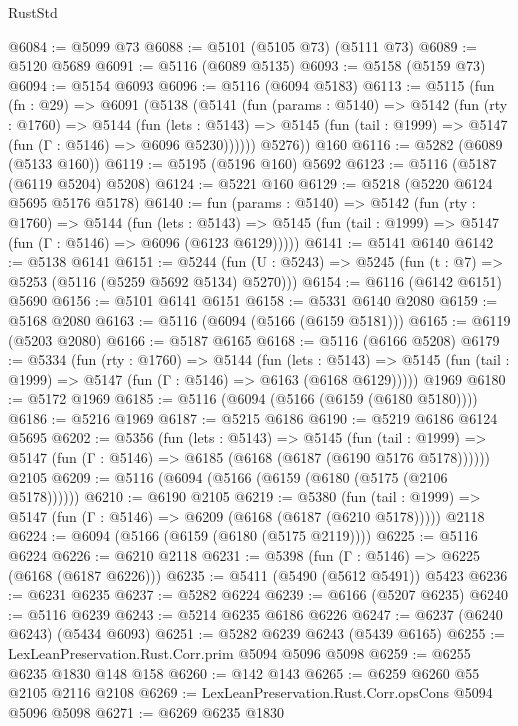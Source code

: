 \begin{lexlean}{RustStd}
\begin{coremodule}
{\begin{coremodule}
{{{{{{{{{{{{{{{{{{{{{{{{{{{{{{{@6084 := @5099 @73
@6088 := @5101 (@5105 @73) (@5111 @73)
@6089 := @5120 @5689
@6091 := @5116 (@6089 @5135)
@6093 := @5158 (@5159 @73)
@6094 := @5154 @6093
@6096 := @5116 (@6094 @5183)
@6113 := @5115
    (fun (fn : @29) =>
    @6091
      (@5138
        (@5141
          (fun (params : @5140) =>
          @5142
            (fun (rty : @1760) =>
            @5144
              (fun (lets : @5143) =>
              @5145 (fun (tail : @1999) => @5147 (fun (Γ : @5146) => @6096 @5230))))))
        @5276))
    @160
@6116 := @5282 (@6089 (@5133 @160))
@6119 := @5195 (@5196 @160) @5692
@6123 := @5116 (@5187 (@6119 @5204) @5208)
@6124 := @5221 @160
@6129 := @5218 (@5220 @6124 @5695 @5176 @5178)
@6140 := fun (params : @5140) =>
  @5142
    (fun (rty : @1760) =>
    @5144
      (fun (lets : @5143) =>
      @5145 (fun (tail : @1999) => @5147 (fun (Γ : @5146) => @6096 (@6123 @6129)))))
@6141 := @5141 @6140
@6142 := @5138 @6141
@6151 := @5244 (fun (U : @5243) => @5245 (fun (t : @7) => @5253 (@5116 (@5259 @5692 @5134) @5270)))
@6154 := @6116 (@6142 @6151) @5690
@6156 := @5101 @6141 @6151
@6158 := @5331 @6140 @2080
@6159 := @5168 @2080
@6163 := @5116 (@6094 (@5166 (@6159 @5181)))
@6165 := @6119 (@5203 @2080)
@6166 := @5187 @6165
@6168 := @5116 (@6166 @5208)
@6179 := @5334
    (fun (rty : @1760) =>
    @5144
      (fun (lets : @5143) =>
      @5145 (fun (tail : @1999) => @5147 (fun (Γ : @5146) => @6163 (@6168 @6129)))))
    @1969
@6180 := @5172 @1969
@6185 := @5116 (@6094 (@5166 (@6159 (@6180 @5180))))
@6186 := @5216 @1969
@6187 := @5215 @6186
@6190 := @5219 @6186 @6124 @5695
@6202 := @5356
    (fun (lets : @5143) =>
    @5145
      (fun (tail : @1999) => @5147 (fun (Γ : @5146) => @6185 (@6168 (@6187 (@6190 @5176 @5178))))))
    @2105
@6209 := @5116 (@6094 (@5166 (@6159 (@6180 (@5175 (@2106 @5178))))))
@6210 := @6190 @2105
@6219 := @5380
    (fun (tail : @1999) => @5147 (fun (Γ : @5146) => @6209 (@6168 (@6187 (@6210 @5178)))))
    @2118
@6224 := @6094 (@5166 (@6159 (@6180 (@5175 @2119))))
@6225 := @5116 @6224
@6226 := @6210 @2118
@6231 := @5398 (fun (Γ : @5146) => @6225 (@6168 (@6187 @6226)))
@6235 := @5411 (@5490 (@5612 @5491)) @5423
@6236 := @6231 @6235
@6237 := @5282 @6224
@6239 := @6166 (@5207 @6235)
@6240 := @5116 @6239
@6243 := @5214 @6235 @6186 @6226
@6247 := @6237 (@6240 @6243) (@5434 @6093)
@6251 := @5282 @6239 @6243 (@5439 @6165)
@6255 := LexLeanPreservation.Rust.Corr.prim @5094 @5096 @5098
@6259 := @6255 @6235 @1830 @148 @158
@6260 := @142 @143
@6265 := @6259 @6260 @55 @2105 @2116 @2108
@6269 := LexLeanPreservation.Rust.Corr.opsCons @5094 @5096 @5098
@6271 := @6269 @6235 @1830
}}}}}}}}}}}}}}}}}}}}}}}}}}}}}}}
\end{coremodule}}
\end{coremodule}
\end{lexlean}
